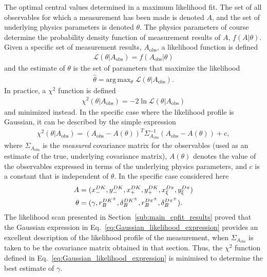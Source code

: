 The optimal central values determined in a maximum likelihood fit. The set of all observables for which a measurement has been made is denoted $A$, and the set of underlying physics parameters is denoted $\theta$. The physics parameters of course determine the probability density function of measurement results of $A$, $f(A|\theta)$. Given a specific set of measurement results, $A_\mathrm{obs}$, a likelihood function is defined
\begin{align}
    \mathcal L (\theta | A_\mathrm{obs}) = f(A_\mathrm{obs}|\theta)
\end{align}
and the estimate of $\theta$ is the set of parameters that maximize the likelihood
\begin{align}
    \hat \theta = \text{arg}\,\text{max}_\theta \; \mathcal L(\theta|A_\mathrm{obs}).
\end{align} In practice, a $\chi^2$ function is defined
\begin{align}
    \chi^2(\theta | A_\mathrm{obs})= -2\ln \mathcal L (\theta | A_\mathrm{obs})
\end{align}
and minimized instead. In the specific case where the likelihood profile is Gaussian, it can be described by the simple expression
\begin{align}\label{eq:Gaussian_likelihood_expression}
    \chi^2(\theta | A_\mathrm{obs}) = \left(A_\mathrm{obs} - A(\theta)\right)^T \Sigma_{A_\mathrm{obs}}^{-1}\left(A_\mathrm{obs} - A(\theta)\right) + c,
\end{align}
where $\Sigma_{A_\mathrm{obs}}$ is the \emph{measured} covariance matrix for the observables (used as an estimate of the true, underlying covariance matrix), $A(\theta)$ denotes the value of the observables expressed in terms of the underlying physics parameters, and $c$ is a constant that is independent of $\theta$. In the specific case considered here
\begin{align}
\begin{split}
        A&=(x_-^{{D}{K}}, y_-^{{D}{K}}, x_+^{{D}{K}}, y_+^{{D}{K}}, x_\xi^{{D}\pi}, y_\xi^{{D}\pi}) \\ 
        \theta &= (\gamma, r_B^{{{D}{{K}^\pm}}}, \delta_B^{{{D}{{K}^\pm}}}, r_B^{D\pi^\pm}, \delta_B^{D\pi^\pm}).
\end{split}
\end{align}
The likelihood scan presented in Section~\ref{sub:main_cpfit_results} proved that the Gaussian expression in Eq.~\eqref{eq:Gaussian_likelihood_expression} provides an excellent description of the likelihood profile of the measurement, when $\Sigma_{A_\mathrm{obs}}$ is taken to be the covariance matrix obtained in that section. Thus, the $\chi^2$ function defined in Eq.~\eqref{eq:Gaussian_likelihood_expression} is minimised to determine the best estimate of $\gamma$. 

